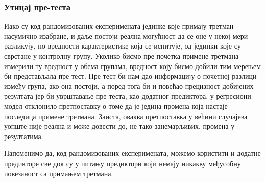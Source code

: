 \documentclass[12pt, a4paper]{article}
\begin{document}
\subsubsection{Утицај пре-теста}

Иако су код рандомизованих експеримената јединке које примају третман насумично изабране, и даље 
постоји реална могућност да се оне у некој мери разликују, по вредности карактеристике која се 
испитује, од јединки које су сврстане у контролну групу. Уколико бисмо пре почетка примене третмана 
измерили ту вредност у обема групама, вредност коју бисмо добили тим мерењем би представљала 
пре-тест. Пре-тест би нам дао информацију о почетној разлици између група, ако она постоји, а 
поред тога би и повећао прецизност добијених резултата јер би уврштавање пре-теста, као додатног 
предиктора, у регресиони модел отклонило претпоставку о томе да је једина промена која настаје 
последица примене третмана. Заиста, оваква претпоставка у већини случајева уопште није реална и 
може довести до, не тако занемарљивих, промена у резултатима. 



Напоменимо да, код рандомизованих експеримената, можемо користити и додатне 
предикторе све док су у питању предиктори који немају никакву међусобну повезаност са примањем 
третмана.
\end{document}
